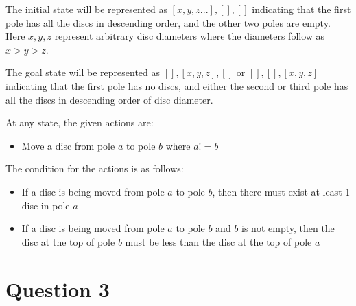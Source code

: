 \documentclass{article}
\begin{document}
The initial state will be represented as $[x, y, z ...], [], []$ indicating that the first pole has all the discs in descending order, and the other two poles are empty. Here $x,y,z$ represent arbitrary disc diameters where the diameters follow as $x>y>z$.
\setlength{\parskip}{6pt}

The goal state will be represented as $[], [x,y,z], []$ or $[], [], [x,y,z]$ indicating that the first pole has no discs, and either the second or third pole has all the discs in descending order of disc diameter.

At any state, the given actions are:
\begin{itemize}
    \item Move a disc from pole $a$ to pole $b$ where $a!=b$
\end{itemize}

The condition for the actions is as follows:
\begin{itemize}
    \item If a disc is being moved from pole $a$ to pole $b$, then there must exist at least 1 disc in pole $a$
    \item If a disc is being moved from pole $a$ to pole $b$ and $b$ is not empty, then the disc at the top of pole $b$ must be less than the disc at the top of pole $a$
\end{itemize}

\section{Question 3}
\end{document}
